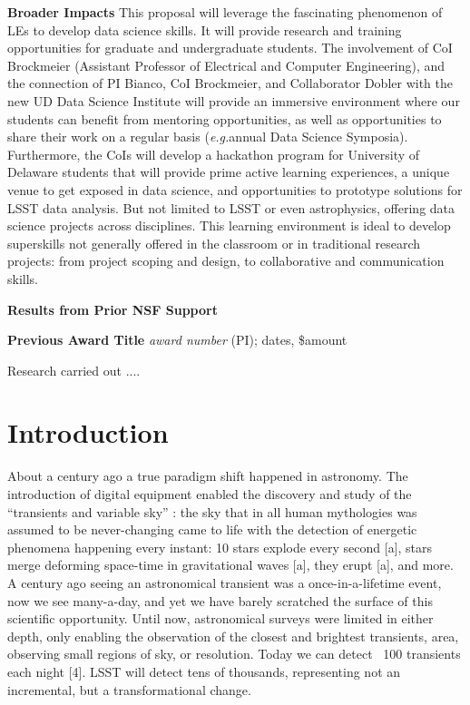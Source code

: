\documentclass{proposalnsf}
\newcommand{\eg}{\emph{e.g.}}
\begin{document}
\noindent
{\bf Broader Impacts}
This proposal will leverage the fascinating phenomenon of LEs to develop data science skills.  It will provide research and training opportunities for graduate and undergraduate students.  The involvement of CoI Brockmeier (Assistant Professor of Electrical and Computer Engineering), and the connection of PI Bianco, CoI Brockmeier, and Collaborator Dobler with the new UD Data Science Institute will provide an immersive environment where our students can benefit from mentoring opportunities, as well as opportunities to share their work on a regular basis (\eg annual Data Science Symposia).   Furthermore, the CoIs will develop a hackathon program for University of Delaware students that will provide prime active learning experiences, a unique venue to get exposed in data science, and opportunities to prototype solutions for LSST data analysis. But not limited to LSST or even astrophysics, offering data science projects across disciplines.  This learning environment is ideal to develop superskills not generally offered in the classroom or in traditional research projects: from project scoping and design, to collaborative and communication skills.
\renewcommand{\thepage} {B--\arabic{page}}



\renewcommand{\thepage} {D--\arabic{page}}

\newpage

\centerline{\bf Results from Prior NSF Support}

\noindent
{\bf Previous Award Title}
{\it award number} (PI); dates, \$amount

Research carried out ....



\section{Introduction}


About a century ago a true paradigm shift happened in astronomy.   The introduction of digital equipment enabled the discovery and study of the “transients and variable sky” : the sky that in all human mythologies was assumed to be never-changing came to life with the detection of energetic phenomena happening every instant: 10 stars explode every second [a], stars merge deforming space-time in gravitational waves [a], they erupt [a], and more.   A century ago seeing an astronomical transient was a once-in-a-lifetime event, now we see many-a-day, and yet we have barely scratched the surface of this scientific opportunity.  Until now, astronomical surveys were limited in either depth, only enabling the observation of the closest and brightest transients, area, observing small regions of sky, or resolution.   Today we can detect ~100 transients each night [4].   LSST will detect tens of thousands, representing not an incremental, but a transformational change.  
\end{document}
